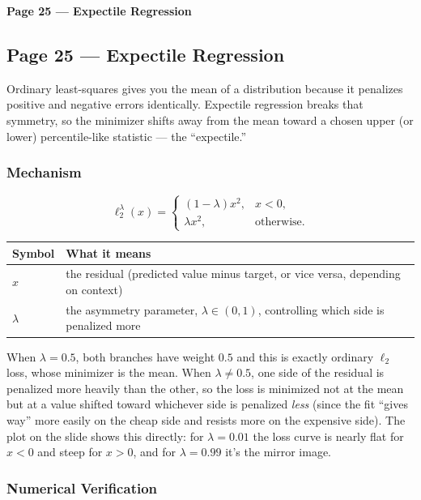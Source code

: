 \bigskip

\textbf{Page 25 --- Expectile Regression}

\subsection*{Page 25 --- Expectile Regression}

Ordinary least-squares gives you the mean of a distribution because it penalizes positive and negative errors identically. Expectile regression breaks that symmetry, so the minimizer shifts away from the mean toward a chosen upper (or lower) percentile-like statistic --- the ``expectile.''

\subsubsection*{Mechanism}

\[
\ell_2^\lambda(x) = \begin{cases} (1-\lambda)x^2, & x < 0, \\ \lambda x^2, & \text{otherwise.} \end{cases}
\]

\begin{center}
\begin{tabular}{@{}ll@{}}
\toprule
Symbol & What it means \\
\midrule
$x$ & the residual (predicted value minus target, or vice versa, depending on context) \\
$\lambda$ & the asymmetry parameter, $\lambda\in(0,1)$, controlling which side is penalized more \\
\bottomrule
\end{tabular}
\end{center}

When $\lambda=0.5$, both branches have weight $0.5$ and this is exactly ordinary $\ell_2$ loss, whose minimizer is the mean. When $\lambda \ne 0.5$, one side of the residual is penalized more heavily than the other, so the loss is minimized not at the mean but at a value shifted toward whichever side is penalized \emph{less} (since the fit ``gives way'' more easily on the cheap side and resists more on the expensive side). The plot on the slide shows this directly: for $\lambda=0.01$ the loss curve is nearly flat for $x<0$ and steep for $x>0$, and for $\lambda=0.99$ it's the mirror image.

\subsubsection*{Numerical Verification}

